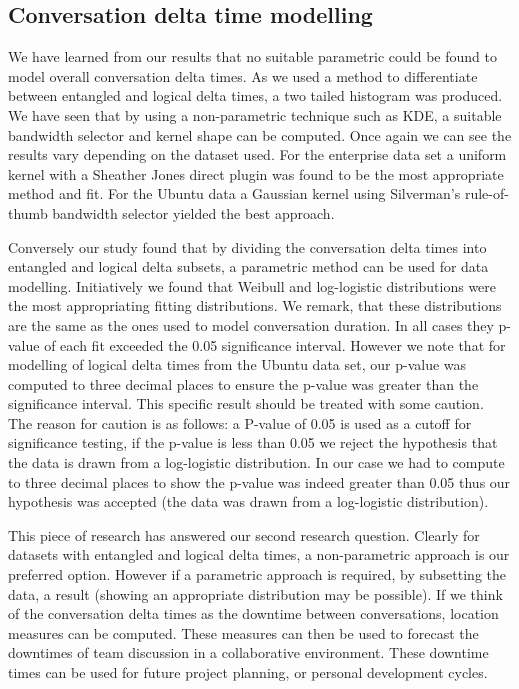 \subsection{Conversation delta time modelling}

We have learned from our results that no suitable parametric could be found to model overall conversation delta times. As we used a method to differentiate between entangled and logical delta times, a two tailed histogram was produced. We have seen that by using a non-parametric technique such as KDE, a suitable bandwidth selector and kernel shape can be computed. Once again we can see the results vary depending on the dataset used. For the enterprise data set a uniform kernel with a Sheather Jones direct plugin was found to be the most appropriate method and fit. For the Ubuntu data a Gaussian kernel using Silverman's rule-of-thumb bandwidth selector yielded the best approach.

Conversely our study found that by dividing the conversation delta times into entangled and logical delta subsets, a parametric method can be used for data modelling. Initiatively we found that Weibull and log-logistic distributions were the most appropriating fitting distributions. We remark, that these distributions are the same as the ones used to model conversation duration. In all cases they p-value of each fit exceeded the 0.05 significance interval. However we note that for modelling of logical delta times from the Ubuntu data set, our p-value was computed to three decimal places to ensure the p-value was greater than the significance interval. This specific result should be treated with some caution. The reason for caution is as follows: a P-value of 0.05 is used as a cutoff for significance testing, if the p-value is less than 0.05 we reject the hypothesis that the data is drawn from a log-logistic distribution. In our case we had to compute to three decimal places to show the p-value was indeed greater than 0.05 thus our hypothesis was accepted (the data was drawn from a log-logistic distribution).  

This piece of research has answered our second research question. Clearly for datasets with entangled and logical delta times, a non-parametric approach is our preferred option. However if a parametric approach is required, by subsetting the data, a result (showing an appropriate distribution may be possible). If we think of the conversation delta times as the downtime between conversations, location measures can be computed. These measures can then be used to forecast the downtimes of team discussion in a collaborative environment. These downtime times can be used for future project planning, or personal development cycles.

